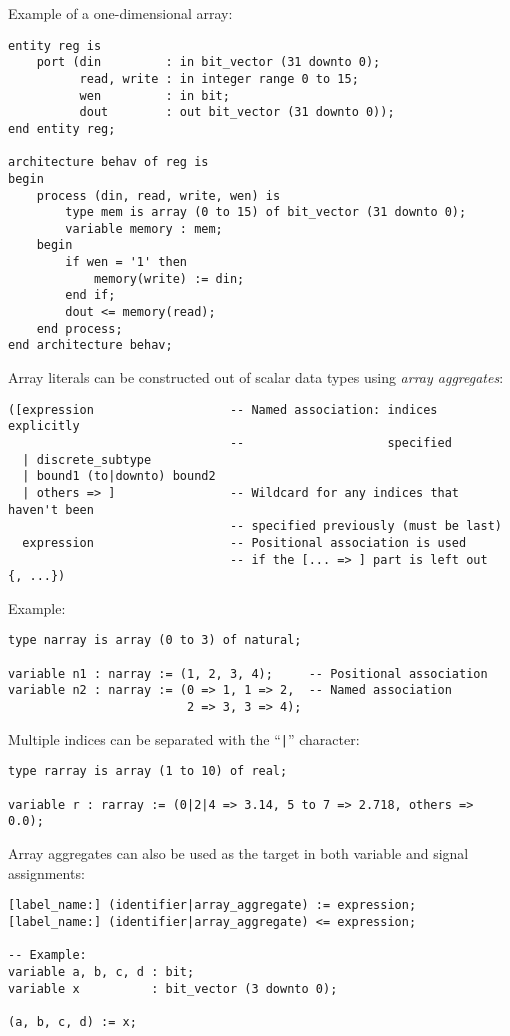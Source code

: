 \documentclass[fontsize=11pt,a4paper]{scrartcl}
\begin{document}
Example of a one-dimensional array:
\begin{lstlisting}
entity reg is
	port (din         : in bit_vector (31 downto 0);
	      read, write : in integer range 0 to 15;
	      wen         : in bit;
	      dout        : out bit_vector (31 downto 0));
end entity reg;

architecture behav of reg is
begin
	process (din, read, write, wen) is
		type mem is array (0 to 15) of bit_vector (31 downto 0);
		variable memory : mem;
	begin
		if wen = '1' then
			memory(write) := din;
		end if;
		dout <= memory(read);
	end process;
end architecture behav;
\end{lstlisting}

Array literals can be constructed out of scalar data types using \emph{array aggregates}:
\begin{lstlisting}
([expression                   -- Named association: indices explicitly
                               --                    specified
  | discrete_subtype
  | bound1 (to|downto) bound2
  | others => ]                -- Wildcard for any indices that haven't been
                               -- specified previously (must be last)
  expression                   -- Positional association is used
                               -- if the [... => ] part is left out
{, ...})
\end{lstlisting}

Example:
\begin{lstlisting}
type narray is array (0 to 3) of natural;

variable n1 : narray := (1, 2, 3, 4);     -- Positional association
variable n2 : narray := (0 => 1, 1 => 2,  -- Named association
                         2 => 3, 3 => 4);
\end{lstlisting}

Multiple indices can be separated with the ``\lstinline!|!'' character:
\begin{lstlisting}
type rarray is array (1 to 10) of real;

variable r : rarray := (0|2|4 => 3.14, 5 to 7 => 2.718, others => 0.0);
\end{lstlisting}

Array aggregates can also be used as the target in both variable and signal assignments:
\begin{lstlisting}
[label_name:] (identifier|array_aggregate) := expression;
[label_name:] (identifier|array_aggregate) <= expression;

-- Example:
variable a, b, c, d : bit;
variable x          : bit_vector (3 downto 0);

(a, b, c, d) := x;
\end{lstlisting}
\end{document}
